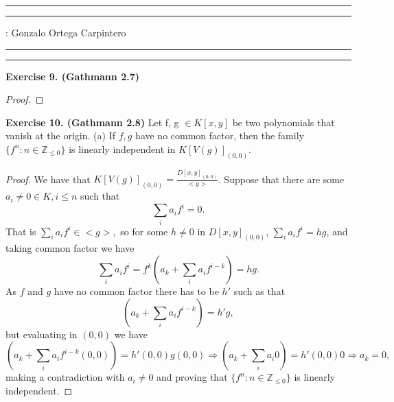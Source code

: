 \documentclass[11pt,a4paper,draft]{article}
\begin{document}
\hrule\hrule
\vspace{1mm}


\vspace{1mm}

 : Gonzalo Ortega Carpintero
\vspace{2mm}

\hrule\hrule


{\bf Exercise 9. (Gathmann 2.7)}
\begin{proof}
  

\end{proof}

\vskip 10mm
{\bf Exercise 10. (Gathmann 2.8)}
Let f, g $ \in K[x,y] $ be two polynomials that vanish at the origin.
\vskip 2mm
(a) If $ f, g $ have no common factor, then the family $\{ f^n: n \in \mathbb Z_{\leq 0}\}$ is linearly independent in $K[V(g)]_{(0,0)}$.
\begin{proof}
  We have that $K[V(g)]_{(0,0)} = \frac{D[x,y]_{(0,0)}}{<g>} $.
  Suppose that there are some $ a_i \neq 0 \in K, i \leq n $ such that
  $$
    \sum_i a_i f^i = 0.
  $$
  That is
  $
    \sum_i a_i f^i \in <g>,
  $ so for some $ h \neq 0 $ in $ D[x,y]_{(0,0)} $,
  $
    \sum_i a_i f^i = hg
  $, and taking common factor we have
  $$
    \sum_i a_i f^i = f^k (a_k + \sum_i a_i f^{i-k}) = hg.
  $$
  As $ f $ and $ g $ have no common factor there has to be $ h' $ such as that
  $$
    (a_k + \sum_i a_i f^{i-k}) = h'g,
  $$
  but evaluating in $ (0, 0) $ we have
  $$
    (a_k + \sum_i a_i f^{i-k}(0, 0)) = h'(0,0) g(0,0) \Rightarrow (a_k + \sum_i a_i 0) = h'(0,0) 0 \Rightarrow a_k = 0,
  $$
  making a contradiction with $ a_i \neq 0 $ and proving that $\{ f^n: n \in \mathbb Z_{\leq 0}\}$ is linearly independent.
\end{proof}
\end{document}
